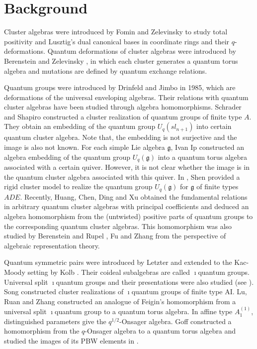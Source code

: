 \documentclass[reqno,11pt]{amsart}
\numberwithin{equation}{section}
\begin{document}

\section{Background}

Cluster algebras were introduced by Fomin and Zelevinsky \cite{ca1,ca2} to study total positivity \cite{G3} and Lusztig's dual canonical bases in coordinate rings and their $q$-deformations\cite{G1,G2}.  Quantum deformations of  cluster algebras were  introduced  by Berenstein and Zelevinsky \cite{AA}, in which each cluster generates a  quantum torus algebra and mutations are defined by quantum exchange relations.

 Quantum groups were introduced by Drinfeld \cite{Dri85} and Jimbo \cite{Jim85} in 1985, which are
deformations of the universal enveloping algebras. Their relations with quantum cluster algebras have been studied through algebra homomorphisms. Schrader and Shapiro \cite{SS19} constructed a cluster realization of quantum groups of finite type $A$. They obtain an embedding  of the quantum group $U_{q}(sl_{n+1})$
into certain quantum cluster algebra. Note that, the embedding is not surjective and
the image  is also not known. For each simple Lie algebra $\mathfrak{g}$, Ivan Ip \cite{Ip18}  constructed an algebra embedding of the
quantum group $U_{q}(\mathfrak{g})$ into a quantum torus algebra associated with a certain quiver. However, it is not clear whether the image  is in the quantum cluster
algebra associated with this quiver. In \cite{Shen}, Shen provided a rigid cluster model to realize the quantum group $U_{q}(\mathfrak{g})$ for $\mathfrak{g}$ of finite types $ADE$.
Recently, Huang, Chen, Ding and Xu \cite{HJY} obtained the fundamental relations in  arbitrary quantum cluster algebras with principal coefficients and  deduced an algebra homomorphism from the (untwisted)  positive parts of quantum groups to the corresponding quantum cluster algebras. This homomorphism was also studied by Berenstein and Rupel \cite{BR},  Fu and Zhang \cite{FZ25} from the perspective of algebraic representation theory.

Quantum symmetric pairs were introduced by Letzter \cite{Let99} and extended to the Kac-Moody setting by Kolb \cite{Ko14}. Their coideal subalgebras are called $\imath$quantum groups. Universal split $\imath$quantum groups and their presentations were also studied (see \cite{LW22,LW23,CLW21a}). Song \cite{So24} constructed cluster realizations of $\imath$quantum groups of finite type $\mathrm{AI}$. Lu, Ruan and Zhang \cite{LRZ25} constructed an analogue of Feigin's homomorphism from a universal split $\imath$quantum group to a quantum torus algebra. In affine type $A_1^{(1)}$, distinguished parameters give the $q^{1/2}$-Onsager algebra. Goff \cite{Goff24} constructed a homomorphism from the $q$-Onsager algebra to a quantum torus algebra and studied the images of its PBW elements in \cite{Goff25}.
\end{document}
